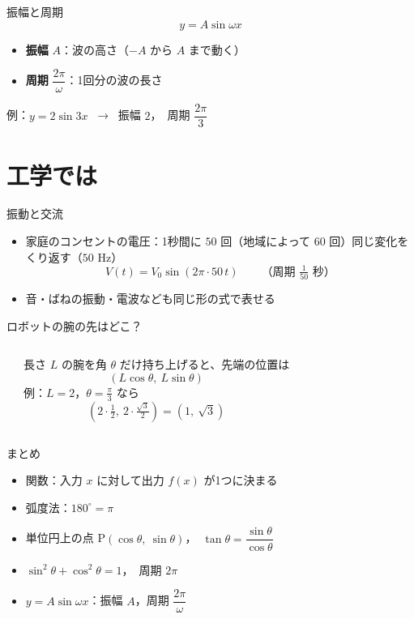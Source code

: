 \documentclass[aspectratio=169]{beamer}
\begin{document}
\begin{frame}{振幅と周期}
  \[
    y = A \sin \omega x
  \]
  \begin{itemize}
    \item \textbf{振幅} $A$：波の高さ（$-A$ から $A$ まで動く）
    \item \textbf{周期} $\dfrac{2\pi}{\omega}$：1回分の波の長さ
  \end{itemize}
  \medskip
  例：$y = 2\sin 3x$ \ → \ 振幅 $2$，\ 周期 $\dfrac{2\pi}{3}$
\end{frame}

\section{工学では}

\begin{frame}{振動と交流}
  \medskip
  \begin{itemize}
    \item 家庭のコンセントの電圧：1秒間に $50$ 回（地域によって $60$ 回）同じ変化をくり返す（$50$ Hz）
      \[
        V(t) = V_0 \sin(2\pi \cdot 50\, t) \qquad \text{（周期 } \tfrac{1}{50} \text{ 秒）}
      \]
    \item 音・ばねの振動・電波なども同じ形の式で表せる
  \end{itemize}
\end{frame}

\begin{frame}{ロボットの腕の先はどこ？}
  \begin{columns}[c]
      \begin{center}
        
      \end{center}
      長さ $L$ の腕を角 $\theta$ だけ持ち上げると、先端の位置は
      \[
        (L\cos\theta,\ L\sin\theta)
      \]
      例：$L = 2$，$\theta = \frac{\pi}{3}$ なら
      \[
        (2 \cdot \tfrac{1}{2},\ 2 \cdot \tfrac{\sqrt{3}}{2}) = (1,\ \sqrt{3})
      \]
  \end{columns}
\end{frame}

\begin{frame}{まとめ}
  \begin{itemize}
    \item 関数：入力 $x$ に対して出力 $f(x)$ が1つに決まる
    \item 弧度法：$180^\circ = \pi$
    \item 単位円上の点 P$(\cos\theta,\ \sin\theta)$，\ $\tan\theta = \dfrac{\sin\theta}{\cos\theta}$
    \item $\sin^2\theta + \cos^2\theta = 1$，\ 周期 $2\pi$
    \item $y = A\sin\omega x$：振幅 $A$，周期 $\dfrac{2\pi}{\omega}$
  \end{itemize}
  \bigskip
\end{frame}
\end{document}
